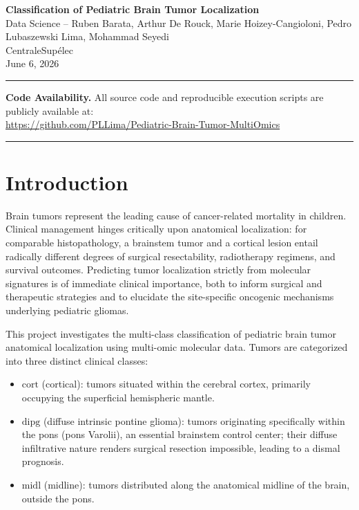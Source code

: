 \documentclass[a4paper,11pt]{paper}
\theoremstyle{plain}
\theoremstyle{definition}
\theoremstyle{remark}
\begin{document}
\begin{center}
    {\huge \bfseries Classification of Pediatric Brain Tumor Localization}\\[1em]
    {\Large Data Science -- Ruben Barata, Arthur De Rouck, Marie Hoizey-Cangioloni, Pedro Lubaszewski Lima, Mohammad Seyedi}\\[0.5em]
    {CentraleSupélec} \\
    June 6, 2026
\end{center}

\noindent\rule{\textwidth}{0.5pt}
\vspace{1em}
\begin{center}
    \textbf{Code Availability.} All source code and reproducible execution scripts are publicly available at:\\
    \url{https://github.com/PLLima/Pediatric-Brain-Tumor-MultiOmics}
\end{center}

\vspace{1em}
\noindent\rule{\textwidth}{0.5pt}

\clearpage
\tableofcontents
\clearpage


\newpage

\section{Introduction}

Brain tumors represent the leading cause of cancer-related mortality in children. Clinical management hinges critically upon anatomical localization: for comparable histopathology, a brainstem tumor and a cortical lesion entail radically different degrees of surgical resectability, radiotherapy regimens, and survival outcomes. Predicting tumor localization strictly from molecular signatures is of immediate clinical importance, both to inform surgical and therapeutic strategies and to elucidate the site-specific oncogenic mechanisms underlying pediatric gliomas.

This project investigates the multi-class classification of pediatric brain tumor anatomical localization using multi-omic molecular data. Tumors are categorized into three distinct clinical classes:
\begin{itemize}
    \item $\text{cort}$ (cortical): tumors situated within the cerebral cortex, primarily occupying the superficial hemispheric mantle.
    \item $\text{dipg}$ (diffuse intrinsic pontine glioma): tumors originating specifically within the pons (pons Varolii), an essential brainstem control center; their diffuse infiltrative nature renders surgical resection impossible, leading to a dismal prognosis.
    \item $\text{midl}$ (midline): tumors distributed along the anatomical midline of the brain, outside the pons.
\end{itemize}
\end{document}
